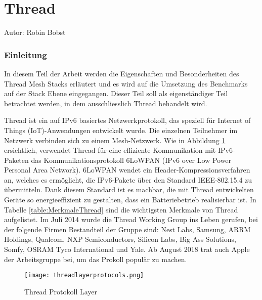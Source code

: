 \vspace*{4cm}
\part{Thread}\label{part:Thread}
Autor: Robin Bobst
\vspace*{\fill}
\clearpage

\section{Einleitung}\label{sec:EinleitungThread}
In diesem Teil der Arbeit werden die Eigenschaften und Besonderheiten des Thread Mesh Stacks erläutert und es wird auf die Umsetzung des Benchmarks auf der Stack Ebene eingegangen. Dieser Teil soll als eigenständiger Teil betrachtet werden, in dem ausschliesslich Thread behandelt wird.

Thread ist ein auf IPv6 basiertes Netzwerkprotokoll, das speziell für Internet of Things (IoT)-Anwendungen entwickelt wurde. Die einzelnen Teilnehmer im Netzwerk verbinden sich zu einem Mesh-Netzwerk. Wie in Abbildung \ref{fig:ThreadProtokollLayer} ersichtlich, verwendet Thread für eine effiziente Kommunikation mit IPv6-Paketen das Kommunikationsprotokoll 6LoWPAN (IPv6 over Low Power Personal Area Network). 6LoWPAN wendet ein Header-Kompressionsverfahren an, welches es ermöglicht, die IPv6-Pakete über den Standard IEEE-802.15.4 zu übermitteln. Dank diesem Standard ist es machbar, die mit Thread entwickelten Geräte so energieeffizient zu gestalten, dass ein Batteriebetrieb realisierbar ist. In Tabelle \ref{table:MerkmaleThread} sind die wichtigsten Merkmale von Thread aufgelistet. Im Juli 2014 wurde die Thread Working Group ins Leben gerufen, bei der folgende Firmen Bestandteil der Gruppe sind: Nest Labs, Samsung, ARRM Holdings, Qualcom, NXP Semiconductors, Silicon Labs, Big Ass Solutions, Somfy, OSRAM Tyco International und Yale. Ab August 2018 trat auch Apple der Arbeitsgruppe bei, um das Prokoll populär zu machen. \cite[Kapitel 1]{thread_group_inc_thread_2017} \\

\begin{figure}[H]
	\centering
	\texttt{[image: threadlayerprotocols.png]}
	\caption{Thread Protokoll Layer \cite{erickson_picture_2019}}
	\label{fig:ThreadProtokollLayer}
\end{figure}

